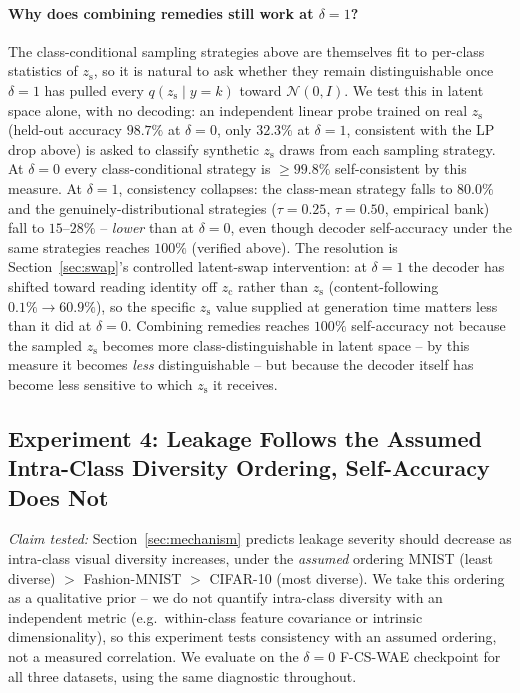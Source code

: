\documentclass[10pt,letterpaper]{article}
\newcommand{\ours}{F-CS-WAE}
\newcommand{\zc}{z_{\mathrm{c}}}
\newcommand{\zs}{z_{\mathrm{s}}}
\begin{document}
\paragraph{Why does combining remedies still work at $\delta{=}1$?} The
class-conditional sampling strategies above are themselves fit to per-class
statistics of $\zs$, so it is natural to ask whether they remain
distinguishable once $\delta{=}1$ has pulled every $q(\zs\mid y{=}k)$ toward
$\mathcal N(0,I)$. We test this in latent space alone, with no decoding: an
independent linear probe trained on real $\zs$ (held-out accuracy $98.7\%$
at $\delta{=}0$, only $32.3\%$ at $\delta{=}1$, consistent with the LP drop
above) is asked to classify synthetic $\zs$ draws from each sampling
strategy. At $\delta{=}0$ every class-conditional strategy is $\geq99.8\%$
self-consistent by this measure. At $\delta{=}1$, consistency collapses:
the class-mean strategy falls to $80.0\%$ and the genuinely-distributional
strategies ($\tau{=}0.25$, $\tau{=}0.50$, empirical bank) fall to
$15$--$28\%$ -- \emph{lower} than at $\delta{=}0$, even though decoder
self-accuracy under the same strategies reaches $100\%$ (verified above).
The resolution is Section~\ref{sec:swap}'s controlled latent-swap intervention: at
$\delta{=}1$ the decoder has shifted toward reading identity off $\zc$
rather than $\zs$ (content-following $0.1\%\to60.9\%$), so the specific
$\zs$ value supplied at generation time matters less than it did at
$\delta{=}0$. Combining remedies reaches $100\%$ self-accuracy not because
the sampled $\zs$ becomes more class-distinguishable in latent space -- by
this measure it becomes \emph{less} distinguishable -- but because the
decoder itself has become less sensitive to which $\zs$ it receives.

\subsection{Experiment 4: Leakage Follows the Assumed Intra-Class Diversity Ordering, Self-Accuracy Does Not}
\label{sec:exp4}
\label{sec:cross-dataset}

\emph{Claim tested:} Section~\ref{sec:mechanism} predicts leakage severity
should decrease as intra-class visual diversity increases, under the
\emph{assumed} ordering MNIST (least diverse) $>$ Fashion-MNIST $>$
CIFAR-10 (most diverse). We take this ordering as a qualitative prior --
we do not quantify intra-class diversity with an independent metric (e.g.\
within-class feature covariance or intrinsic dimensionality), so this
experiment tests consistency with an assumed ordering, not a measured
correlation. We evaluate on the $\delta{=}0$ \ours{} checkpoint for all
three datasets, using the same diagnostic throughout.
\end{document}
